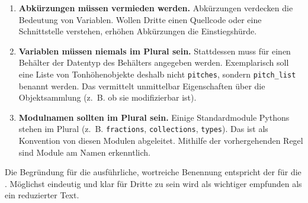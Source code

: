 \documentclass[12pt,a4paper,ngerman]{article}
\begin{document}
\begin{enumerate}
    \item{%
            \textbf{Abkürzungen müssen vermieden werden.}
            Abkürzungen verdecken die Bedeutung von Variablen.
            Wollen Dritte einen Quellcode oder eine Schnittstelle verstehen, erhöhen Abkürzungen die Einstiegshürde.
    }
    \item{%
            \textbf{Variablen müssen niemals im Plural sein.}
            Stattdessen muss für einen Behälter der Datentyp des Behälters angegeben werden.
            Exemplarisch soll eine Liste von Tonhöhenobjekte deshalb nicht \texttt{pitches}, sondern \texttt{pitch\_list} benannt werden.
            Das vermittelt unmittelbar Eigenschaften über die Objektsammlung (z.~B. ob sie modifizierbar ist).
    }
    \item{%
            \textbf{Modulnamen sollten im Plural sein.}
            Einige Standardmodule Pythons stehen im Plural (z.~B. \texttt{fractions}, \texttt{collections}, \texttt{types}).
            Das ist als Konvention von diesen Modulen abgeleitet.
            Mithilfe der vorhergehenden Regel sind Module am Namen erkenntlich.
    }
\end{enumerate}

Die Begründung für die ausführliche, wortreiche Benennung entspricht der für die \emph{}.
Möglichst eindeutig und klar für Dritte zu sein wird als wichtiger empfunden als ein reduzierter Text.


% 

\end{document}
